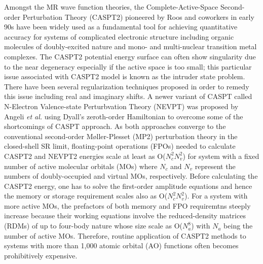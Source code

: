 \documentclass[aip,jcp,amsmath]{revtex4-1}
\begin{document}
%
%
%
Amongst the MR wave function theories, the Complete-Active-Space Second-order Perturbation Theory (CASPT2) pioneered by Roos and coworkers\cite{doi:10.1021/j100377a012,doi:10.1063/1.462209} in early 90s have been widely used as a fundamental tool for achieving quantitative accuracy for systems of complicated electronic structure including organic molecules of doubly-excited nature\cite{doi:10.1063/1.2889385} and mono-\cite{doi:10.1021/ct900567c,doi:10.1021/acs.jctc.9b00166} and multi-nuclear\cite{Cramer2008,doi:10.1002/chem.201902766} transition metal complexes.
%
The CASPT2 potential energy surface can often show singularity due to the near degeneracy especially if the active space is too small; this particular issue associated with CASPT2 model is known as the intruder state problem.
%
There have been several regularization techniques proposed in order to remedy this issue including real\cite{ROOS1995215} and imaginary\cite{FORSBERG1997196} shifts.
%
A newer variant of CASPT called N-Electron Valence-state Perturbvation Theory (NEVPT) was proposed by Angeli {\it et al.}\cite{angeliintroduction2001,angelin-electron2002,angelinew2006} using Dyall's zeroth-order Hamiltonian\cite{dyallthe1995} to overcome some of the shortcomings of CASPT approach.
%
As both approaches converge to the conventional second-order M\o ller-Plesset (MP2) perturbation theory\cite{MP2} in the closed-shell SR limit, floating-point operations (FPOs) needed to calculate CASPT2 and NEVPT2 energies scale at least as O($N_c^2N_v^2$) for system with a fixed number of active molecular orbitals (MOs) where $N_c$ and $N_v$ represent the numbers of doubly-occupied and virtual MOs, respectively.
%
Before calculating the CASPT2 energy, one has to solve the first-order amplitude equations and hence the memory or storage requirement scales also as O($N_c^2N_v^2$).
%
For a system with more active MOs, the prefactors of both memory and FPO requiremtns steeply increase because their working equations involve the reduced-density matrices (RDMs) of up to four-body nature whose size scale as O($N_a^8$) with $N_a$ being the number of active MOs.
%
Therefore, routine application of CASPT2 methods to systems with more than 1,000 atomic orbital (AO) functions often becomes prohibitively expensive.
\end{document}

